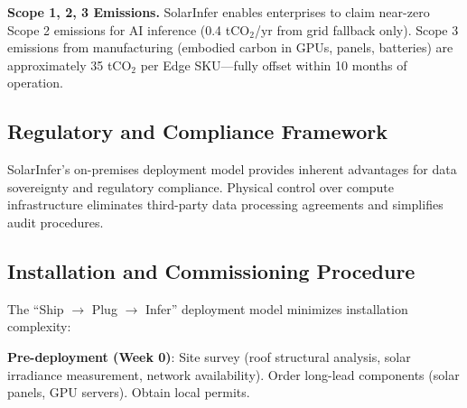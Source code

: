 \documentclass[conference,10pt,letterpaper]{IEEEtran}
\begin{document}
\textbf{Scope 1, 2, 3 Emissions.} SolarInfer enables enterprises to claim near-zero Scope 2 emissions for AI inference (0.4 tCO$_2$/yr from grid fallback only). Scope 3 emissions from manufacturing (embodied carbon in GPUs, panels, batteries) are approximately 35 tCO$_2$ per Edge SKU---fully offset within 10 months of operation.

\subsection{Regulatory and Compliance Framework}

\begin{table}[!t]
\caption{Regulatory Compliance Matrix}
\label{tab:compliance}
\centering\scriptsize
{}
\end{table}

SolarInfer's on-premises deployment model provides inherent advantages for data sovereignty and regulatory compliance. Physical control over compute infrastructure eliminates third-party data processing agreements and simplifies audit procedures.

\subsection{Installation and Commissioning Procedure}

The ``Ship $\to$ Plug $\to$ Infer'' deployment model minimizes installation complexity:

\textbf{Pre-deployment (Week 0)}: Site survey (roof structural analysis, solar irradiance measurement, network availability). Order long-lead components (solar panels, GPU servers). Obtain local permits.
\end{document}
